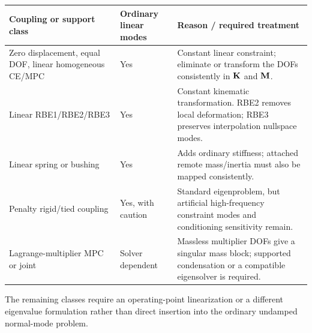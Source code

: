 \begin{center}
\small
\begin{tabular}{|p{}|p{}|p{}|}
\hline
\textbf{Coupling or support class} & \textbf{Ordinary linear modes} & \textbf{Reason / required treatment} \\
\hline
Zero displacement, equal DOF, linear homogeneous CE/MPC & Yes & Constant linear constraint; eliminate or transform the DOFs consistently in $\mathbf{K}$ and $\mathbf{M}$. \\
\hline
Linear RBE1/RBE2/RBE3 & Yes & Constant kinematic transformation. RBE2 removes local deformation; RBE3 preserves interpolation nullspace modes. \\
\hline
Linear spring or bushing & Yes & Adds ordinary stiffness; attached remote mass/inertia must also be mapped consistently. \\
\hline
Penalty rigid/tied coupling & Yes, with caution & Standard eigenproblem, but artificial high-frequency constraint modes and conditioning sensitivity remain. \\
\hline
Lagrange-multiplier MPC or joint & Solver dependent & Massless multiplier DOFs give a singular mass block; supported condensation or a compatible eigensolver is required. \\
\hline
\end{tabular}
\label{tab:coupling-modal-direct}
\end{center}

The remaining classes require an operating-point linearization or a different
eigenvalue formulation rather than direct insertion into the ordinary undamped
normal-mode problem.

